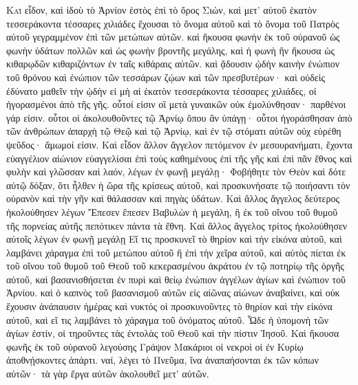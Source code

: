 \begin{pages}
    \begin{Rightside}
        \beginnumbering
		\renewcommand{\LettrineFontHook}{\PHtitl}
		\lettrine[lines=3]{Κ}{αὶ} εἶδον, καὶ ἰδοὺ τὸ Ἀρνίον ἑστὸς ἐπὶ τὸ ὄρος Σιών, καὶ μετ’ αὐτοῦ ἑκατὸν τεσσεράκοντα τέσσαρες χιλιάδες ἔχουσαι τὸ ὄνομα αὐτοῦ καὶ τὸ ὄνομα τοῦ Πατρὸς αὐτοῦ γεγραμμένον ἐπὶ τῶν μετώπων αὐτῶν. καὶ ἤκουσα φωνὴν ἐκ τοῦ οὐρανοῦ ὡς φωνὴν ὑδάτων πολλῶν καὶ ὡς φωνὴν βροντῆς μεγάλης, καὶ ἡ φωνὴ ἣν ἤκουσα ὡς κιθαρῳδῶν κιθαριζόντων ἐν ταῖς κιθάραις αὐτῶν. 
		\pend
		\pstart
		καὶ ᾄδουσιν ᾠδὴν καινὴν ἐνώπιον τοῦ θρόνου καὶ ἐνώπιον τῶν τεσσάρων ζῴων καὶ τῶν πρεσβυτέρων· καὶ οὐδεὶς ἐδύνατο μαθεῖν τὴν ᾠδὴν εἰ μὴ αἱ ἑκατὸν τεσσεράκοντα τέσσαρες χιλιάδες, οἱ ἠγορασμένοι ἀπὸ τῆς γῆς. οὗτοί εἰσιν οἳ μετὰ γυναικῶν οὐκ ἐμολύνθησαν· παρθένοι γάρ εἰσιν. οὗτοι οἱ ἀκολουθοῦντες τῷ Ἀρνίῳ ὅπου ἂν ὑπάγῃ· οὗτοι ἠγοράσθησαν ἀπὸ τῶν ἀνθρώπων ἀπαρχὴ τῷ Θεῷ καὶ τῷ Ἀρνίῳ, καὶ ἐν τῷ στόματι αὐτῶν οὐχ εὑρέθη ψεῦδος· ἄμωμοί εἰσιν.
		\pend
		\pstart
		Καὶ εἶδον ἄλλον ἄγγελον πετόμενον ἐν μεσουρανήματι, ἔχοντα εὐαγγέλιον αἰώνιον εὐαγγελίσαι ἐπὶ τοὺς καθημένους ἐπὶ τῆς γῆς καὶ ἐπὶ πᾶν ἔθνος καὶ φυλὴν καὶ γλῶσσαν καὶ λαόν, λέγων ἐν φωνῇ μεγάλῃ· Φοβήθητε τὸν Θεὸν καὶ δότε αὐτῷ δόξαν, ὅτι ἦλθεν ἡ ὥρα τῆς κρίσεως αὐτοῦ, καὶ προσκυνήσατε τῷ ποιήσαντι τὸν οὐρανὸν καὶ τὴν γῆν καὶ θάλασσαν καὶ πηγὰς ὑδάτων. 
		\pend
		\pstart
		Καὶ ἄλλος ἄγγελος δεύτερος ἠκολούθησεν λέγων Ἔπεσεν ἔπεσεν Βαβυλὼν ἡ μεγάλη, ἣ ἐκ τοῦ οἴνου τοῦ θυμοῦ τῆς πορνείας αὐτῆς πεπότικεν πάντα τὰ ἔθνη. 
		\pend
		\pstart
		Καὶ ἄλλος ἄγγελος τρίτος ἠκολούθησεν αὐτοῖς λέγων ἐν φωνῇ μεγάλῃ Εἴ τις προσκυνεῖ τὸ θηρίον καὶ τὴν εἰκόνα αὐτοῦ, καὶ λαμβάνει χάραγμα ἐπὶ τοῦ μετώπου αὐτοῦ ἢ ἐπὶ τὴν χεῖρα αὐτοῦ, καὶ αὐτὸς πίεται ἐκ τοῦ οἴνου τοῦ θυμοῦ τοῦ Θεοῦ τοῦ κεκερασμένου ἀκράτου ἐν τῷ ποτηρίῳ τῆς ὀργῆς αὐτοῦ, καὶ βασανισθήσεται ἐν πυρὶ καὶ θείῳ ἐνώπιον ἀγγέλων ἁγίων καὶ ἐνώπιον τοῦ Ἀρνίου. 
		\pend
		\pstart
		καὶ ὁ καπνὸς τοῦ βασανισμοῦ αὐτῶν εἰς αἰῶνας αἰώνων ἀναβαίνει, καὶ οὐκ ἔχουσιν ἀνάπαυσιν ἡμέρας καὶ νυκτός οἱ προσκυνοῦντες τὸ θηρίον καὶ τὴν εἰκόνα αὐτοῦ, καὶ εἴ τις λαμβάνει τὸ χάραγμα τοῦ ὀνόματος αὐτοῦ. Ὧδε ἡ ὑπομονὴ τῶν ἁγίων ἐστίν, οἱ τηροῦντες τὰς ἐντολὰς τοῦ Θεοῦ καὶ τὴν πίστιν Ἰησοῦ. 
		\pend
		\pstart
		Καὶ ἤκουσα φωνῆς ἐκ τοῦ οὐρανοῦ λεγούσης Γράψον Μακάριοι οἱ νεκροὶ οἱ ἐν Κυρίῳ ἀποθνῄσκοντες ἀπάρτι. ναί, λέγει τὸ Πνεῦμα, ἵνα ἀναπαήσονται ἐκ τῶν κόπων αὐτῶν· τὰ γὰρ ἔργα αὐτῶν ἀκολουθεῖ μετ’ αὐτῶν.

\end{Rightside}
\end{pages}
